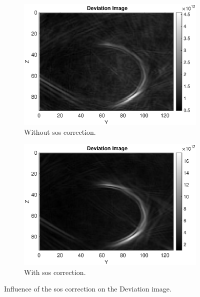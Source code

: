 \begin{figure}[H]
     \centering
     \begin{subfigure}[b]{0.47\textwidth}
                  \centering
         \includegraphics[width=1.09\textwidth]{Graphics/Results/14_vecs_sos_vs_noSos/Deviation_14vecs_no_sos_x_direction.eps}
         \caption{Without \ac{sos} correction.}
         \label{leer}
     \end{subfigure}
     \hfill
     \begin{subfigure}[b]{0.47\textwidth}
         \centering
         \includegraphics[width=1.09\linewidth]{Graphics/Results/14_vecs_sos_vs_noSos/Deviation_14vecs_with_sos_x_direction.eps}
         \caption{With \ac{sos} correction. }
         \label{leer}
     \end{subfigure}
        \caption{Influence of the \ac{sos} correction on the Deviation image.}
        \label{leer}
\end{figure}










